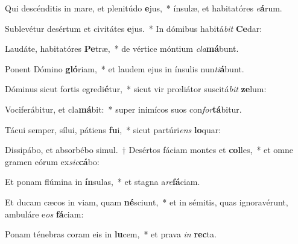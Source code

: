 \item Qui descénditis in mare, et plenitúdo \textbf{e}jus,~* ínsulæ, et habitatóres \textit{e}\textbf{á}rum.
\item Sublevétur desértum et civitátes \textbf{e}jus.~* In dómibus habitá\textit{bit} \textbf{Ce}dar:
\item Laudáte, habitatóres \textbf{Pe}træ,~* de vértice móntium \textit{cla}\textbf{má}bunt.
\item Ponent Dómino \textbf{gló}riam,~* et laudem ejus in ínsulis nun\textit{ti}\textbf{á}bunt.
\item Dóminus sicut fortis egredi\textbf{é}tur,~* sicut vir prœliátor suscitá\textit{bit} \textbf{ze}lum:
\item Vociferábitur, et cla\textbf{má}bit:~* super inimícos suos con\textit{for}\textbf{tá}bitur.
\item Tácui semper, sílui, pátiens \textbf{fu}i,~* sicut partúri\textit{ens} \textbf{lo}quar:
\item Dissipábo, et absorbébo simul.~† Desértos fáciam montes et \textbf{col}les,~* et omne gramen eórum ex\textit{sic}\textbf{cá}bo:
\item Et ponam flúmina in \textbf{ín}sulas,~* et stagna a\textit{re}\textbf{fá}ciam.
\item Et ducam cæcos in viam, quam \textbf{né}sciunt,~* et in sémitis, quas ignoravérunt, ambuláre e\textit{os} \textbf{fá}ciam:
\item Ponam ténebras coram eis in \textbf{lu}cem,~* et prava \textit{in} \textbf{rec}ta.
